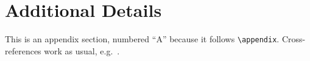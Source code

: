 \clearpage
\appendix

\section{Additional Details}
\label{app:details}
This is an appendix section, numbered ``A'' because it follows
\verb|\appendix|. Cross-references work as usual, e.g.\ .

\lipsum[1]
